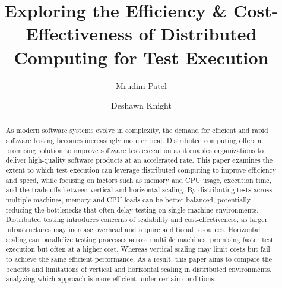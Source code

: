 \documentclass[runningheads]{llncs}
\begin{document}
%
\title{Exploring the Efficiency \& Cost-Effectiveness of Distributed Computing for Test Execution}
%
%
%
\author{Mrudini Patel \and
Deshawn Knight}
%
%
%
%
\maketitle              %
%
%
\begin{abstract}
As modern software systems evolve in complexity, the demand for efficient and rapid software testing becomes increasingly more critical. Distributed computing offers a promising solution to improve software test execution as it enables organizations to deliver high-quality software products at an accelerated rate. This paper examines the extent to which test execution can leverage distributed computing to improve efficiency and speed, while focusing on factors such as memory and CPU usage, execution time, and the trade-offs between vertical and horizontal scaling. By distributing tests across multiple machines, memory and CPU loads can be better balanced, potentially reducing the bottlenecks that often delay testing on single-machine environments. Distributed testing introduces concerns of scalability and cost-effectiveness, as larger infrastructures may increase overhead and require additional resources.  Horizontal scaling can parallelize testing processes across multiple machines, promising faster test execution but often at a higher cost. Whereas vertical scaling may limit costs but fail to achieve the same efficient performance. As a result, this paper aims to compare the benefits and limitations of vertical and horizontal scaling in distributed environments, analyzing which approach is more efficient under certain conditions. 

\end{abstract}
%
%






%
%
%



% 
\end{document}
